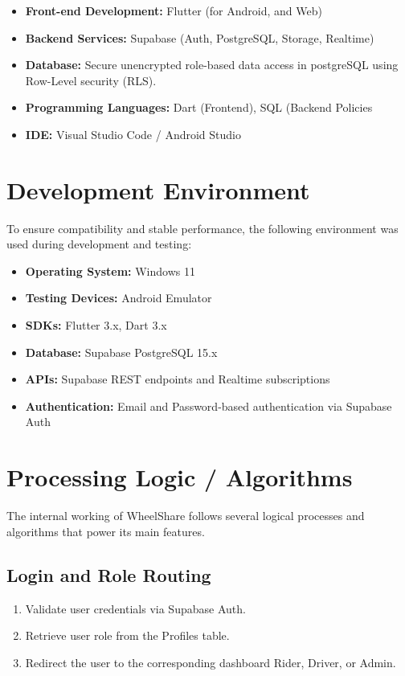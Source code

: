 \begin{itemize}
    \item \textbf{Front-end Development:} Flutter (for Android, and Web) 
    \item \textbf{Backend Services:} Supabase (Auth, PostgreSQL, Storage, Realtime)
    
    \item \textbf{Database:} Secure unencrypted role-based data access in postgreSQL using Row-Level security (RLS). 
    \item \textbf{Programming Languages:} Dart (Frontend), SQL (Backend Policies 
    \item \textbf{IDE:} Visual Studio Code / Android Studio 
\end{itemize}
    

\section{Development Environment }
To ensure compatibility and stable performance, the following environment was used during development and testing: 

\begin{itemize}
    \item \textbf{Operating System:} Windows 11 
    \item \textbf{Testing Devices:} Android Emulator
    \item \textbf{SDKs:} Flutter 3.x, Dart 3.x 
    \item \textbf{Database:} Supabase PostgreSQL 15.x 
    \item \textbf{APIs:} Supabase REST endpoints and Realtime subscriptions 
    \item \textbf{Authentication:} Email and Password-based authentication via Supabase Auth  
    \end{itemize}
\section{Processing Logic / Algorithms}
The internal working of WheelShare follows several logical processes and algorithms that power its main features.

\subsection{Login and Role Routing}
\begin{enumerate}
    \item Validate user credentials via Supabase Auth.
    \item Retrieve user role from the Profiles table.
    \item Redirect the user to the corresponding dashboard Rider, Driver, or Admin.
\end{enumerate}

